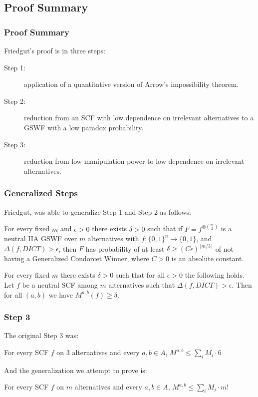 \documentclass[aspectratio=169]{beamer}
\begin{document}
	\subsection{Proof Summary}

		\begin{frame}
			\frametitle{Proof Summary}
			Friedgut's proof is in three steps:
			\begin{description}
				\item[Step 1:] application of a quantitative version of Arrow's impossibility theorem.
				\item[Step 2:] reduction from an SCF with low dependence on irrelevant alternatives to a GSWF with a low paradox probability.
				\item[Step 3:] reduction from low manipulation power to low dependence on irrelevant alternatives.
			\end{description}
		\end{frame}

		\begin{frame}
			\frametitle{Generalized Steps}

			Friedgut, was able to generalize Step 1 and Step 2 as follows:

			\begin{lemma}
				For every fixed $m$ and $\epsilon > 0$ there exists $\delta > 0$ such that if $F = f^{\otimes \binom{m}{2}}$ is a neutral IIA GSWF over $m$ alternatives with $f : \{0,1\}^n \rightarrow \{0,1\}$, and $\Delta(f, DICT) > \epsilon$, then $F$ has probability of at least $\delta \ge (C\epsilon)^{\lfloor m/3 \rfloor}$ of not having a Generalized Condorcet Winner, where $C > 0$ is an absolute constant.
			\end{lemma}

			\begin{lemma}
				For every fixed $m$ there exists $\delta > 0$ such that for all $\epsilon > 0$ the following holds. Let $f$ be a neutral SCF among $m$ alternatives such that $\Delta(f, DICT) > \epsilon$. Then for all $(a,b)$ we have $M^{a,b}(f) \ge \delta$.
			\end{lemma}

		\end{frame}

		\begin{frame}
			\frametitle{Step 3}

			The original Step 3 was:

			\begin{lemma}
				For every SCF $f$ on $3$ alternatives and every $a,b \in A$, $M^{a,b} \le \sum_i M_i \cdot 6$
			\end{lemma}

			And the generalization we attempt to prove is:

			\begin{lemma}
				For every SCF $f$ on $m$ alternatives and every $a,b \in A$, $M^{a,b} \le \sum_i M_i \cdot m!$
			\end{lemma}
		\end{frame}
\end{document}
